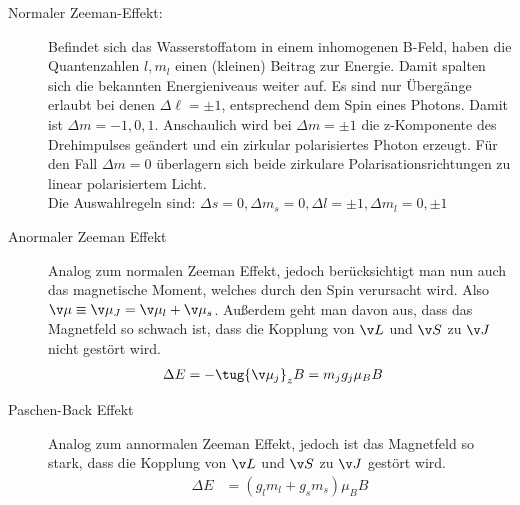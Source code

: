 \documentclass[twocolumn]{summery_4.1}
\begin{document}
\begin{description}
    \item[Normaler Zeeman-Effekt:]
    Befindet sich das Wasserstoffatom in einem inhomogenen B-Feld, haben die Quantenzahlen \(l,m_l\) einen (kleinen) Beitrag zur Energie. Damit spalten sich die bekannten Energieniveaus weiter auf.     
    Es sind nur Übergänge erlaubt bei denen \(\Delta \ell=\pm 1\), entsprechend dem Spin eines Photons. Damit ist \(\Delta m = -1,0,1\).
    Anschaulich wird bei $\Delta m = \pm1$ die z-Komponente des Drehimpulses geändert
    und ein zirkular polarisiertes Photon erzeugt. Für den Fall $\Delta m = 0$ überlagern sich beide zirkulare
    Polarisationsrichtungen zu linear polarisiertem Licht.\\
    Die Auswahlregeln sind: \(\Delta s = 0, \Delta m_s=0, \Delta l =\pm 1, \Delta m_l = 0,\pm1\)

    \item[Anormaler Zeeman Effekt]
    Analog zum normalen Zeeman Effekt, jedoch berücksichtigt man nun auch das magnetische Moment, welches durch den Spin verursacht wird. 
    Also \(\v \mu \equiv \v \mu_J = \v \mu_l + \v \mu_s\). Außerdem geht man davon aus, dass das Magnetfeld so schwach ist, dass die Kopplung von \(\v L\) und \(\v S\) zu \(\v J\) nicht gestört wird. 
    \begin{align*}
        \Delta E &= - \tug{\v \mu_j}_z B = m_j g_j \mu_B B
    \end{align*}

    \item[Paschen-Back Effekt]
    Analog zum annormalen Zeeman Effekt, jedoch ist das Magnetfeld so stark, dass die Kopplung von \(\v L\) und \(\v S\) zu \(\v J\) gestört wird. 
    \begin{align*}
        \Delta E &= (g_l m_l + g_s m_s) \mu_B B 
    \end{align*}


\end{description}
\end{document}

